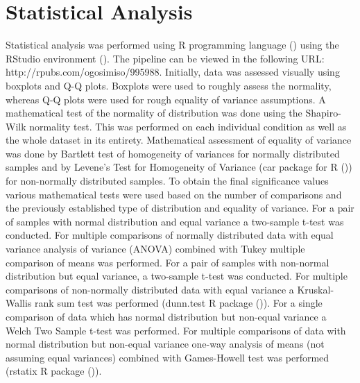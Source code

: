 \section{Statistical Analysis} \label{sec:Statistical Analysis}
Statistical analysis was performed using R programming language (\cite{RCoreTeam2022R:Computing}) using the RStudio environment (\cite{RStudioTeam2022RStudio:RStudio}). The pipeline can be viewed in the following URL: http://rpubs.com/ogosimiso/995988. Initially, data was assessed visually using boxplots and Q-Q plots. Boxplots were used to roughly assess the normality, whereas Q-Q plots were used for rough equality of variance assumptions. A mathematical test of the normality of distribution was done using the Shapiro-Wilk normality test. This was performed on each individual condition as well as the whole dataset in its entirety. Mathematical assessment of equality of variance was done by Bartlett test of homogeneity of variances for normally distributed samples and by Levene's Test for Homogeneity of Variance (car package for R (\cite{Fox2019AnRegression})) for non-normally distributed samples. To obtain the final significance values various mathematical tests were used based on the number of comparisons and the previously established type of distribution and equality of variance. For a pair of samples with normal distribution and equal variance a two-sample t-test was conducted. For multiple comparisons of normally distributed data with equal variance analysis of variance (ANOVA) combined with Tukey multiple comparison of means was performed. For a pair of samples with non-normal distribution but equal variance, a two-sample t-test was conducted. For multiple comparisons of non-normally distributed data with equal variance a Kruskal-Wallis rank sum test was performed (dunn.test R package (\cite{Dinno2017Dunn.test:Sums})). For a single comparison of data which has normal distribution but non-equal variance a Welch Two Sample t-test was performed. For multiple comparisons of data with normal distribution but non-equal variance one-way analysis of means (not assuming equal variances) combined with Games-Howell test was performed (rstatix R package (\cite{Kassambara2022Rstatix:Tests})). 

